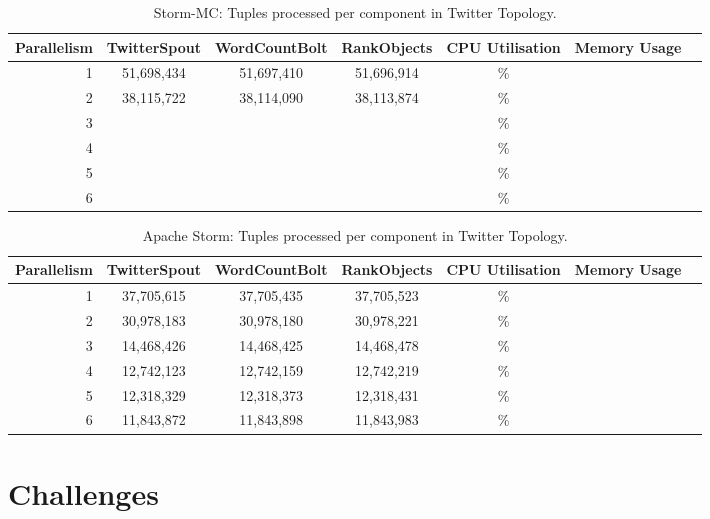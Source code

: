 \begin{table}[!htb]
\begin{adjustwidth}{-0.5in}{-0.5in}
\centering
\small
\begin{tabular}{@{}rcccccl@{}}
    {Parallelism} & {TwitterSpout} & {WordCountBolt} & {RankObjects} & {CPU Utilisation} & {Memory Usage} \\ \toprule
    1 & {51,698,434} & {51,697,410} & {51,696,914} & {\%} & {} \\
    2 & {38,115,722} & {38,114,090} & {38,113,874} & {\%} & {} \\
    3 & {} & {} & {} & {\%} & {} \\
    4 & {} & {} & {} & {\%} & {} \\
    5 & {} & {} & {} & {\%} & {} \\
    6 & {} & {} & {} & {\%} & {} \\
\end{tabular}
\caption{Storm-MC: Tuples processed per component in Twitter Topology.}
\label{table:storm_mc_twitter}
\end{adjustwidth}
\end{table}

\begin{table}[!htb]
\begin{adjustwidth}{-0.5in}{-0.5in}
\centering
\small
\begin{tabular}{@{}rcccccl@{}}
    {Parallelism} & {TwitterSpout} & {WordCountBolt} & {RankObjects} & {CPU Utilisation} & {Memory Usage} \\ \toprule
    1 & {37,705,615} & {37,705,435} & {37,705,523} & {\%} & {} \\
    2 & {30,978,183} & {30,978,180} & {30,978,221} & {\%} & {} \\
    3 & {14,468,426} & {14,468,425} & {14,468,478} & {\%} & {} \\
    4 & {12,742,123} & {12,742,159} & {12,742,219} & {\%} & {} \\
    5 & {12,318,329} & {12,318,373} & {12,318,431} & {\%} & {} \\
    6 & {11,843,872} & {11,843,898} & {11,843,983} & {\%} & {} \\
\end{tabular}
\caption{Apache Storm: Tuples processed per component in Twitter Topology.}
\label{table:storm_twitter}
\end{adjustwidth}
\end{table}

\section{Challenges}
\label{sec:challenges}

